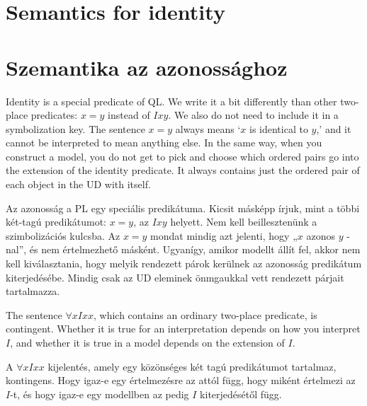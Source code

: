 


\section*{Semantics for identity}
\section{Szemantika az azonossághoz}
Identity is a special predicate of QL. We write it a bit differently than other two-place predicates: $x=y$ instead of $Ixy$. We also do not need to include it in a symbolization key. The sentence $x=y$ always means `$x$ is identical to $y$,'  and it cannot be interpreted to mean anything else. In the same way, when you construct a model, you do not get to pick and choose which ordered pairs go into the extension of the identity predicate. It always contains just the ordered pair of each object in the UD with itself.

Az azonosság a PL egy speciális predikátuma. Kicsit másképp írjuk, mint a többi két-tagú predikátumot: $ x = y $, az $ Ixy $ helyett. Nem kell beillesztenünk a szimbolizációs kulcsba. Az $ x = y $ mondat mindig azt jelenti, hogy „$ x $ azonos  $ y $ -nal”, és nem értelmezhető másként. Ugyanígy, amikor modellt állít fel, akkor nem kell kiválasztania, hogy melyik rendezett párok kerülnek az azonosság predikátum kiterjedésébe. Mindig csak az UD eleminek önmgaukkal vett rendezett párjait tartalmazza.

The sentence $\forall x Ixx$, which contains an ordinary two-place predicate, is contingent. Whether it is true for an interpretation depends on how you interpret $I$, and whether it is true in a model depends on the extension of $I$.

A $ \forall x Ixx$ kijelentés, amely egy közönséges két tagú predikátumot tartalmaz, kontingens. Hogy igaz-e egy értelmezésre az attól függ, hogy miként értelmezi az $I$-t, és hogy igaz-e egy modellben az pedig $I$ kiterjedésétől függ.

